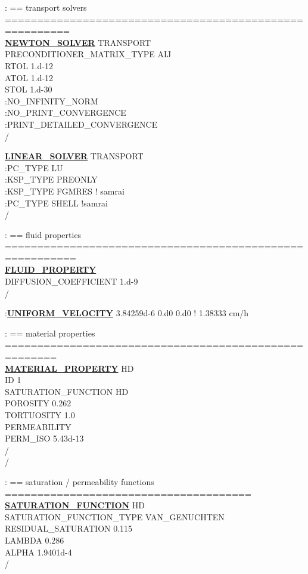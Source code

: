 \documentclass[12pt]{article}
\begin{document}
\noindent
: == transport solvers ========================================================\\
\hyperlink{target_newt}{\bf NEWTON\_SOLVER} TRANSPORT\\
PRECONDITIONER\_MATRIX\_TYPE AIJ\\
RTOL 1.d-12\\
ATOL 1.d-12\\
STOL 1.d-30\\
:NO\_INFINITY\_NORM\\
:NO\_PRINT\_CONVERGENCE\\
:PRINT\_DETAILED\_CONVERGENCE\\
/

\noindent
\hyperlink{target_linsolv}{\bf LINEAR\_SOLVER} TRANSPORT\\
:PC\_TYPE LU\\
:KSP\_TYPE PREONLY\\
:KSP\_TYPE FGMRES ! samrai\\
:PC\_TYPE SHELL !samrai\\
/

\noindent
: == fluid properties =========================================================\\
\hyperlink{target_fluid_property}{\bf FLUID\_PROPERTY}\\
DIFFUSION\_COEFFICIENT 1.d-9\\
/

\noindent
:\hyperlink{target_unifvel}{\bf UNIFORM\_VELOCITY} 3.84259d-6 0.d0 0.d0  ! 1.38333 cm/h

\noindent
: == material properties ======================================================\\
\hyperlink{target_mat}{\bf MATERIAL\_PROPERTY} HD\\
ID 1\\
SATURATION\_FUNCTION HD\\
POROSITY 0.262\\
TORTUOSITY 1.0\\
PERMEABILITY\\
PERM\_ISO 5.43d-13\\
/\\
/

\noindent
: == saturation / permeability functions ======================================\\
\hyperlink{target_sat}{\bf SATURATION\_FUNCTION} HD\\
SATURATION\_FUNCTION\_TYPE VAN\_GENUCHTEN\\
RESIDUAL\_SATURATION 0.115\\
LAMBDA 0.286\\
ALPHA 1.9401d-4\\
/
\end{document}
